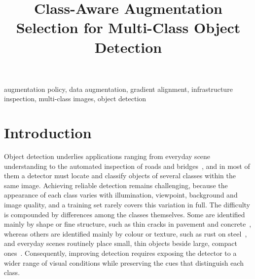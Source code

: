 \documentclass[conference]{IEEEtran}
\begin{document}
\title{Class-Aware Augmentation Selection for Multi-Class Object Detection}
\maketitle


\begin{IEEEkeywords}
augmentation policy, data augmentation, gradient alignment, infrastructure inspection, multi-class images, object detection
\end{IEEEkeywords}

\section{Introduction}
\label{sec:intro}

Object detection underlies applications ranging from everyday scene understanding to the automated inspection of roads and bridges~\cite{everingham2010voc,shang2024automated,zheng2024deep,vision2025inspection}, and in most of them a detector must locate and classify objects of several classes within the same image. Achieving reliable detection remains challenging, because the appearance of each class varies with illumination, viewpoint, background and image quality, and a training set rarely covers this variation in full. The difficulty is compounded by differences among the classes themselves. Some are identified mainly by shape or fine structure, such as thin cracks in pavement and concrete~\cite{arya2024rdd,flotzinger2024dacl10k}, whereas others are identified mainly by colour or texture, such as rust on steel~\cite{flotzinger2024dacl10k}, and everyday scenes routinely place small, thin objects beside large, compact ones~\cite{everingham2010voc}. Consequently, improving detection requires exposing the detector to a wider range of visual conditions while preserving the cues that distinguish each class.
\end{document}
